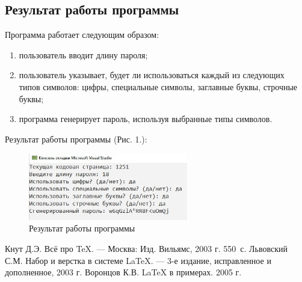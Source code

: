 \documentclass[12pt,a4paper]{scrartcl}
\begin{document}
\subsection{Результат работы программы}
Программа работает следующим образом:

\begin{enumerate}
    \item пользователь вводит длину пароля;
    \item пользователь указывает, будет ли использоваться каждый из следующих типов символов: цифры, специальные символы, заглавные буквы, строчные буквы;
    \item программа генерирует пароль, используя выбранные типы символов.
    \end{enumerate}
    \noindent

Результат работы программы (Рис. 1.):

\begin{figure}[h]
 \centering
 \includegraphics[width=0.62\textwidth]{1.jpg}
 \caption{Результат работы программы}\label{fig:par}
\end{figure}

\begin{thebibliography}{9}
Кнут Д.Э. Всё про \TeX. \newblock --- Москва: Изд. Вильямс, 2003 г. 550~с.
Львовский С.М. Набор и верстка в системе \LaTeX{}. \newblock --- 3-е издание, исправленное и дополненное, 2003 г.
Воронцов К.В. \LaTeX{} в примерах. 2005 г.
\end{thebibliography}
\end{document}
